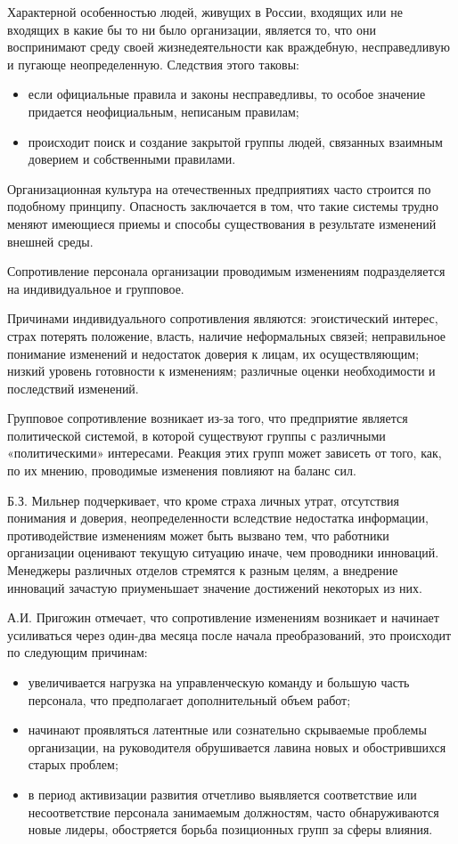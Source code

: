 Характерной особенностью людей, живущих в России, входящих или не входящих в какие бы то ни было организации, является то, что они воспринимают среду своей жизнедеятельности как враждебную, несправедливую и пугающе неопределенную. Следствия этого таковы:
\begin{itemize}
	\item если официальные правила и законы несправедливы, то особое значение придается неофициальным, неписаным правилам;
\item происходит поиск и создание закрытой группы людей, связанных взаимным доверием и собственными правилами.
\end{itemize}

Организационная культура на отечественных предприятиях часто строится по подобному принципу. Опасность заключается в том, что такие системы трудно меняют имеющиеся приемы и способы существования в результате изменений внешней среды.

Сопротивление персонала организации проводимым изменениям подразделяется на индивидуальное и групповое.

Причинами индивидуального сопротивления являются: эгоистический интерес, страх потерять положение, власть, наличие неформальных связей; неправильное понимание изменений и недостаток доверия к лицам, их осуществляющим; низкий уровень готовности к изменениям; различные оценки необходимости и последствий изменений.

Групповое сопротивление возникает из-за того, что предприятие является политической системой, в которой существуют группы с различными «политическими» интересами. Реакция этих групп может зависеть от того, как, по их мнению, проводимые изменения повлияют на баланс сил.

Б.З. Мильнер подчеркивает, что кроме страха личных утрат, отсутствия понимания и доверия, неопределенности вследствие недостатка информации, противодействие изменениям может быть вызвано тем, что работники организации оценивают текущую ситуацию иначе, чем проводники инноваций. Менеджеры различных отделов стремятся к разным целям, а внедрение инноваций зачастую приуменьшает значение достижений некоторых из них.

А.И. Пригожин отмечает, что сопротивление изменениям возникает и начинает усиливаться через один-два месяца после начала преобразований, это происходит по следующим причинам:
\begin{itemize}
	\item увеличивается нагрузка на управленческую команду и большую часть персонала, что предполагает дополнительный объем работ;
\item начинают проявляться латентные или сознательно скрываемые проблемы организации, на руководителя обрушивается лавина новых и обострившихся старых проблем;
\item в период активизации развития отчетливо выявляется соответствие или несоответствие персонала занимаемым должностям, часто обнаруживаются новые лидеры, обостряется борьба позиционных групп за сферы влияния.
\end{itemize}

